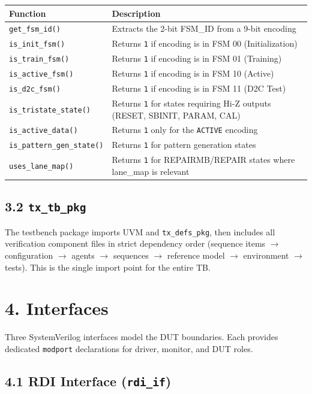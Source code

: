 \documentclass[11pt,a4paper]{article}
\begin{document}
\begin{tabularx}{\textwidth}{|X|X|}
\hline
\textbf{Function} & \textbf{Description} \\
\hline
\texttt{get\_fsm\_id()} & Extracts the 2-bit FSM\_ID from a 9-bit encoding \\
\hline
\texttt{is\_init\_fsm()} & Returns \texttt{1} if encoding is in FSM 00 (Initialization) \\
\hline
\texttt{is\_train\_fsm()} & Returns \texttt{1} if encoding is in FSM 01 (Training) \\
\hline
\texttt{is\_active\_fsm()} & Returns \texttt{1} if encoding is in FSM 10 (Active) \\
\hline
\texttt{is\_d2c\_fsm()} & Returns \texttt{1} if encoding is in FSM 11 (D2C Test) \\
\hline
\texttt{is\_tristate\_state()} & Returns \texttt{1} for states requiring Hi-Z outputs (RESET, SBINIT, PARAM, CAL) \\
\hline
\texttt{is\_active\_data()} & Returns \texttt{1} only for the \texttt{ACTIVE} encoding \\
\hline
\texttt{is\_pattern\_gen\_state()} & Returns \texttt{1} for pattern generation states \\
\hline
\texttt{uses\_lane\_map()} & Returns \texttt{1} for REPAIRMB/REPAIR states where lane\_map is relevant \\
\hline
\end{tabularx}


\subsection{3.2 \texttt{tx\_tb\_pkg}}

The testbench package imports UVM and \texttt{tx\_defs\_pkg}, then includes all verification component files in strict dependency order (sequence items $\rightarrow$ configuration $\rightarrow$ agents $\rightarrow$ sequences $\rightarrow$ reference model $\rightarrow$ environment $\rightarrow$ tests). This is the single import point for the entire TB.


\section{4. Interfaces}

Three SystemVerilog interfaces model the DUT boundaries. Each provides dedicated \texttt{modport} declarations for driver, monitor, and DUT roles.

\subsection{4.1 RDI Interface (\texttt{rdi\_if})}
\end{document}
